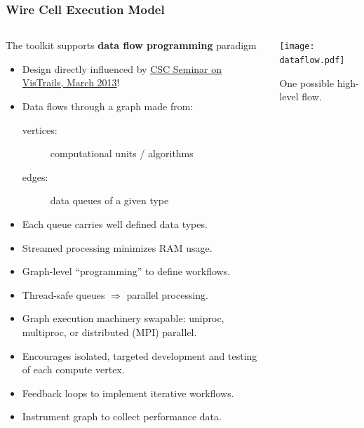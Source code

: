 \documentclass[xcolor=dvipsnames]{beamer}
\begin{document}
\begin{frame}[fragile]
  \frametitle{Wire Cell Execution Model}

  \begin{columns}
    \begin{column}{0.7\textwidth}
      \footnotesize 
      The toolkit supports \textbf{data flow programming} paradigm
      \begin{itemize}
        \item Design directly influenced by
          \href{http://www0.bnl.gov/events/details.php?q=8932}{CSC Seminar on VisTrails, March 2013}!
        \item Data flows through a graph made from:
          \begin{description}
          \item[vertices:] computational units / algorithms
          \item[edges:] data queues of a given type
          \end{description}
        \item Each queue carries well defined data types.
        \item Streamed processing minimizes RAM usage.
        \item Graph-level ``programming'' to define workflows.
        \item Thread-safe queues $\Rightarrow$ parallel processing.
        \item Graph execution machinery swapable: uniproc, multiproc, or
          distributed (MPI) parallel.
        \item Encourages isolated, targeted development and testing of each
          compute vertex.
        \item Feedback loops to implement iterative workflows.
        \item Instrument graph to collect performance data.
        \end{itemize}
      \end{column}
      \begin{column}{0.3\textwidth}

        \vspace{-10mm}

        \texttt{[image: dataflow.pdf]}

        \tiny One possible high-level flow.
      \end{column}
    \end{columns}
\end{frame}
\end{document}

